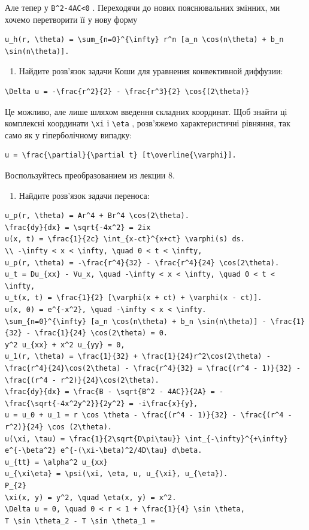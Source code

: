 \documentclass[
  ukrainian,
]{article}
\providecommand{\tightlist}{%
  \setlength{\itemsep}{0pt}\setlength{\parskip}{0pt}}
\begin{document}
Але тепер у \texttt{B\^{}2-4AC\textless{}0} . Переходячи до нових
пояснювальних змінних, ми хочемо перетворити її у нову форму

\begin{verbatim}
u_h(r, \theta) = \sum_{n=0}^{\infty} r^n [a_n \cos(n\theta) + b_n \sin(n\theta)].
\end{verbatim}

\begin{enumerate}
\def\labelenumi{\arabic{enumi}.}
\setcounter{enumi}{1}
\tightlist
\item
  Найдите розв'язок задачи Коши для уравнения конвективной диффузии:
\end{enumerate}

\begin{verbatim}
\Delta u = -\frac{r^2}{2} - \frac{r^3}{2} \cos{(2\theta)}
\end{verbatim}

Це можливо, але лише шляхом введення складних координат. Щоб знайти ці
комплексні координати \texttt{\textbackslash{}xi} і
\texttt{\textbackslash{}eta} , розв'яжемо характеристичні рівняння, так
само як у гіперболічному випадку:

\begin{verbatim}
u = \frac{\partial}{\partial t} [t\overline{\varphi}].
\end{verbatim}

Воспользуйтесь преобразованием из лекции 8.

\begin{enumerate}
\def\labelenumi{\arabic{enumi}.}
\setcounter{enumi}{2}
\tightlist
\item
  Найдите розв'язок задачи переноса:
\end{enumerate}

\begin{verbatim}
u_p(r, \theta) = Ar^4 + Br^4 \cos(2\theta).
\frac{dy}{dx} = \sqrt{-4x^2} = 2ix
u(x, t) = \frac{1}{2c} \int_{x-ct}^{x+ct} \varphi(s) ds.
\\ -\infty < x < \infty, \quad 0 < t < \infty,
u_p(r, \theta) = -\frac{r^4}{32} - \frac{r^4}{24} \cos(2\theta).
u_t = Du_{xx} - Vu_x, \quad -\infty < x < \infty, \quad 0 < t < \infty,
u_t(x, t) = \frac{1}{2} [\varphi(x + ct) + \varphi(x - ct)].
u(x, 0) = e^{-x^2}, \quad -\infty < x < \infty.
\sum_{n=0}^{\infty} [a_n \cos(n\theta) + b_n \sin(n\theta)] - \frac{1}{32} - \frac{1}{24} \cos(2\theta) = 0.
y^2 u_{xx} + x^2 u_{yy} = 0,
u_1(r, \theta) = \frac{1}{32} + \frac{1}{24}r^2\cos(2\theta) - \frac{r^4}{24}\cos(2\theta) - \frac{r^4}{32} = \frac{(r^4 - 1)}{32} - \frac{(r^4 - r^2)}{24}\cos(2\theta).
\frac{dy}{dx} = \frac{B - \sqrt{B^2 - 4AC}}{2A} = -\frac{\sqrt{-4x^2y^2}}{2y^2} = -i\frac{x}{y},
u = u_0 + u_1 = r \cos \theta - \frac{(r^4 - 1)}{32} - \frac{(r^4 - r^2)}{24} \cos (2\theta).
u(\xi, \tau) = \frac{1}{2\sqrt{D\pi\tau}} \int_{-\infty}^{+\infty} e^{-\beta^2} e^{-(\xi-\beta)^2/4D\tau} d\beta.
u_{tt} = \alpha^2 u_{xx}
u_{\xi\eta} = \psi(\xi, \eta, u, u_{\xi}, u_{\eta}).
P_{2}
\xi(x, y) = y^2, \quad \eta(x, y) = x^2.
\Delta u = 0, \quad 0 < r < 1 + \frac{1}{4} \sin \theta,
T \sin \theta_2 - T \sin \theta_1 =
\end{verbatim}
\end{document}

